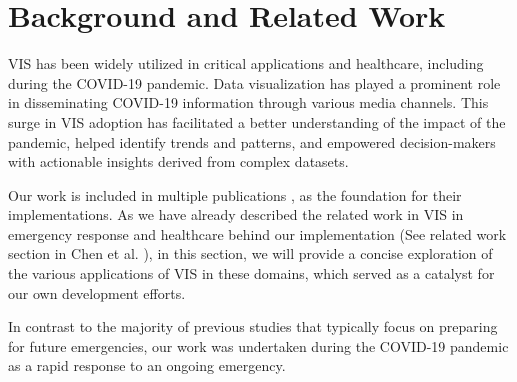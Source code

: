 \section{Background and Related Work}

\ac{VIS} has been widely utilized in critical applications and healthcare, including during the COVID-19 pandemic.
Data visualization has played a prominent role in disseminating COVID-19 information through various media channels.
This surge in \ac{VIS} adoption has facilitated a better understanding of the impact of the pandemic, helped identify trends and patterns, and empowered decision-makers with actionable insights derived from complex datasets.

Our work is included in multiple publications \cite{chen2022RAMPVIS,dykes2022Visualizationb,khan2022Propagating,rydow2023RAMPVIS}, as the foundation for their implementations.
As we have already described the related work in \ac{VIS} in emergency response and healthcare behind our implementation (See related work section in Chen et al. \cite{chen2022RAMPVIS}), in this section, we will provide a concise exploration of the various applications of \ac{VIS} in these domains, which served as a catalyst for our own development efforts.

In contrast to the majority of previous studies that typically focus on preparing for future emergencies, our work was undertaken during the COVID-19 pandemic as a rapid response to an ongoing emergency.